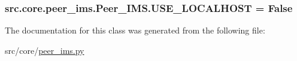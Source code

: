 \subsubsection[{U\+S\+E\+\_\+\+L\+O\+C\+A\+L\+H\+O\+S\+T}]{\setlength{\rightskip}{0pt plus 5cm}src.\+core.\+peer\+\_\+ims.\+Peer\+\_\+\+I\+M\+S.\+U\+S\+E\+\_\+\+L\+O\+C\+A\+L\+H\+O\+S\+T = False\hspace{0.3cm}{\ttfamily [static]}}\label{classsrc_1_1core_1_1peer__ims_1_1Peer__IMS_aca1872083e540265591dd9dc51113f0b}


The documentation for this class was generated from the following file\+:\begin{DoxyCompactItemize}
\item 
src/core/\hyperlink{peer__ims_8py}{peer\+\_\+ims.\+py}\end{DoxyCompactItemize}
